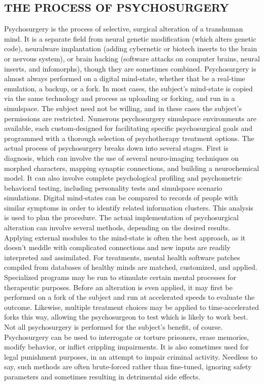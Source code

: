 \subsection{THE PROCESS OF PSYCHOSURGERY}
Psychosurgery is the process of selective, surgical alteration
of a transhuman mind. It is a separate field from
neural genetic modification (which alters genetic code),
neuralware implantation (adding cybernetic or biotech
inserts to the brain or nervous system), or brain hacking
(software attacks on computer brains, neural inserts, and
infomorphs), though they are sometimes combined.
Psychosurgery is almost always performed on a
digital mind-state, whether that be a real-time emulation,
a backup, or a fork. In most cases, the subject’s
mind-state is copied via the same technology and process
as uploading or forking, and run in a simulspace.
The subject need not be willing, and in these cases
the subject’s permissions are restricted. Numerous
psychosurgery simulspace environments are available,
each custom-designed for facilitating specific psychosurgical
goals and programmed with a thorough
selection of psychotherapy treatment options.
The actual process of psychosurgery breaks down
into several stages. First is diagnosis, which can
involve the use of several neuro-imaging techniques
on morphed characters, mapping synaptic connections,
and building a neurochemical model. It can
also involve complete psychological profiling and
psychometric behavioral testing, including personality
tests and simulspace scenario simulations. Digital
mind-states can be compared to records of people
with similar symptoms in order to identify related
information clusters. This analysis is used to plan
the procedure.
The actual implementation of psychosurgical alteration
can involve several methods, depending on
the desired results. Applying external modules to the
mind-state is often the best approach, as it doesn’t
meddle with complicated connections and new inputs
are readily interpreted and assimilated. For treatments,
mental health software patches compiled from
databases of healthy minds are matched, customized,
and applied. Specialized programs may be run to
stimulate certain mental processes for therapeutic
purposes. Before an alteration is even applied, it may
first be performed on a fork of the subject and run at
accelerated speeds to evaluate the outcome. Likewise,
multiple treatment choices may be applied to time-accelerated
forks this way, allowing the psychosurgeon
to test which is likely to work best.
Not all psychosurgery is performed for the subject’s
benefit, of course. Psychosurgery can be used to interrogate
or torture prisoners, erase memories, modify
behavior, or inflict crippling impairments. It is also
sometimes used for legal punishment purposes, in
an attempt to impair criminal activity. Needless to
say, such methods are often brute-forced rather than
fine-tuned, ignoring safety parameters and sometimes
resulting in detrimental side effects.


